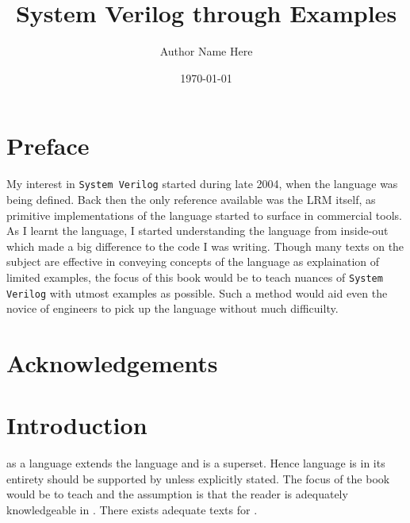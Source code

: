 \documentclass[11pt]{book}              %
\title{\bf System Verilog through Examples}    %
\author{Author Name Here}              %
\date{\today}                           %
\begin{document}



\frontmatter                            %
\maketitle                              %
\tableofcontents                        %

\chapter{Preface}
My interest in \texttt{System Verilog} started during late 2004, when
the language was being defined. Back then the only reference available
was the LRM itself, as primitive implementations of the language
started to surface in commercial tools. As I learnt the language, I
started understanding the language from inside-out which made a big
difference to the code I was writing. Though many texts on the subject
are effective in conveying concepts of the language as explaination of
limited examples, the focus of this book would be to teach nuances of
\texttt{System Verilog} with utmost examples as possible. Such a
method would aid even the novice of engineers to pick up the language
without much difficuilty.

\chapter{Acknowledgements}

\chapter{Introduction}                %
\lsvlog as a language extends the \lvlog language and is a
superset. Hence \lvlog language is in its entirety should be supported
by \lsvlog unless explicitly stated. The focus of the book would be to
teach \svlog and the assumption is that the reader is adequately
knowledgeable in \lvlog. There exists adequate texts for \lvlog.

\mainmatter                             %



\end{document}
